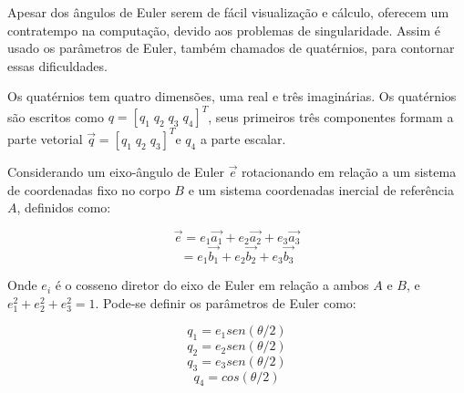 Apesar dos ângulos de Euler serem de fácil visualização e cálculo, oferecem um contratempo na computação, devido aos problemas de singularidade. Assim é usado os parâmetros de Euler, também chamados de quatérnios, para contornar essas dificuldades.

Os quatérnios tem quatro dimensões, uma real e três imaginárias. Os quatérnios são escritos como \begin{math}q=[q_1\; q_2\; q_3\;  q_4]^T\end{math}, seus primeiros  três componentes formam a parte vetorial \begin{math}\vec{q}=[q_1\;q_2\;q_3]^T\end{math}e \begin{math}q_4\end{math} a parte escalar.

Considerando um eixo-ângulo de Euler \begin{math}\vec{e}\end{math} rotacionando em relação a um sistema de coordenadas fixo no corpo \begin{math}B\end{math} e um sistema coordenadas inercial de referência \begin{math}A\end{math}, definidos como:

\begin{equation}\vec{e}=e_1\vec{a_1}+e_2\vec{a_2}+e_3\vec{a_3}\end{equation}
\begin{equation}=e_1\vec{b_1}+e_2\vec{b_2}+e_3\vec{b_3}\end{equation}

Onde \begin{math}e_i\end{math} é o cosseno diretor do eixo de Euler em relação a ambos \begin{math}A\end{math} e \begin{math}B\end{math}, e \begin{math}e_1^2+e_2^2+e_3^2=1\end{math}. Pode-se definir os parâmetros de Euler como:

\begin{equation}q_1=e_1sen(\theta/2)\end{equation}
\begin{equation}q_2=e_2sen(\theta/2)\end{equation}
\begin{equation}q_3=e_3sen(\theta/2)\end{equation}
\begin{equation}q_4=cos(\theta/2)\end{equation}

